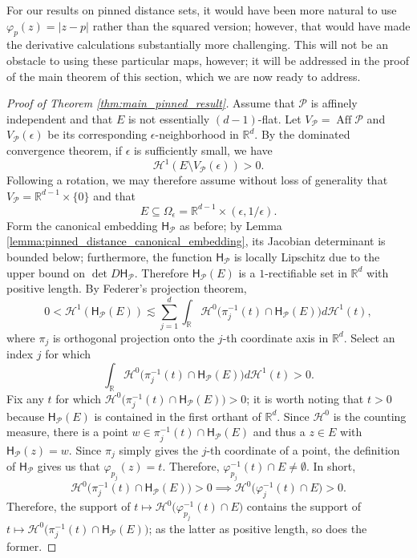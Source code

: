 \documentclass[12pt]{amsart}
\theoremstyle{definition}
\numberwithin{equation}{section}
\DeclareMathOperator{\Aff}{Aff}
\begin{document}
For our results on pinned distance sets, it would have been more natural to use $\varphi_p(z) = |z - p|$ rather than the squared version; however, that would have made the derivative calculations substantially more challenging. This will not be an obstacle to using these particular maps, however; it will be addressed in the proof of the main theorem of this section, which we are now ready to address.

\begin{proof}[Proof of Theorem \ref{thm:main_pinned_result}]
Assume that $\mathcal{P}$ is affinely independent and that $E$ is not essentially $(d - 1)$-flat. Let $V_{\mathcal{P}} = \Aff \mathcal{P}$ and $V_{\mathcal{P}}(\epsilon)$ be its corresponding $\epsilon$-neighborhood in $\mathbb{R}^d$. By the dominated convergence theorem, if $\epsilon$ is sufficiently small, we have
$$\mathcal{H}^1(E \setminus V_{\mathcal P}(\epsilon)) > 0.$$
Following a rotation, we may therefore assume without loss of generality that $V_{\mathcal{P}} = \mathbb{R}^{d - 1} \times \{0\}$ and that $$E \subseteq \Omega_{\epsilon} = \mathbb{R}^{d - 1} \times (\epsilon, 1/\epsilon).$$
Form the canonical embedding $\mathsf{H}_{\mathcal{P}}$ as before; by Lemma \ref{lemma:pinned_distance_canonical_embedding}, its Jacobian determinant is bounded below; furthermore, the function $\mathsf{H}_{\mathcal{P}}$ is locally Lipschitz due to the upper bound on $\det D\mathsf{H}_{\mathcal{P}}$. Therefore $\mathsf{H}_{\mathcal{P}}(E)$ is a $1$-rectifiable set in $\mathbb{R}^d$ with positive length. By Federer's projection theorem,
$$0 < \mathcal{H}^1(\mathsf{H}_{\mathcal P}(E)) \lesssim \sum_{j = 1}^d \int_{\mathbb{R}} \mathcal{H}^0\big(\pi_j^{-1}(t) \cap \mathsf{H}_{\mathcal{P}}(E)\big) d\mathcal{H}^1(t),$$
where $\pi_j$ is orthogonal projection onto the $j$-th coordinate axis in $\mathbb{R}^d$. Select an index $j$ for which
$$\int_{\mathbb{R}} \mathcal{H}^0\big(\pi_j^{-1}(t) \cap \mathsf{H}_{\mathcal{P}}(E)\big) d\mathcal{H}^1(t) > 0.$$
Fix any $t$ for which $\mathcal{H}^0\big(\pi_j^{-1}(t) \cap \mathsf{H}_{\mathcal{P}}(E)\big) > 0$; it is worth noting that $t > 0$ because $\mathsf{H}_{\mathcal P}(E)$ is contained in the first orthant of $\mathbb{R}^d$. Since $\mathcal{H}^0$ is the counting measure, there is a point $w \in \pi_j^{-1}(t) \cap \mathsf{H}_{\mathcal{P}}(E)$ and thus a $z \in E$ with $\mathsf{H}_{\mathcal{P}}(z) = w$. Since $\pi_j$ simply gives the $j$-th coordinate of a point, the definition of $\mathsf{H}_{\mathcal{P}}$ gives us that $\varphi_{p_j}(z) = t.$ Therefore, $\varphi_{p_j}^{-1}(t) \cap E \ne \emptyset$. In short,
$$\mathcal{H}^0\big(\pi_j^{-1}(t) \cap \mathsf{H}_{\mathcal P}(E)\big) > 0 \implies \mathcal{H}^0(\varphi_j^{-1}(t) \cap E\big) > 0.$$
Therefore, the support of $t \mapsto \mathcal{H}^0\big(\varphi_{p_j}^{-1}(t) \cap E\big)$ contains the support of $t \mapsto \mathcal{H}^0\big(\pi_j^{-1}(t) \cap \mathsf{H}_{\mathcal{P}}(E)\big)$; as the latter as positive length, so does the former.


\end{proof}
\end{document}

